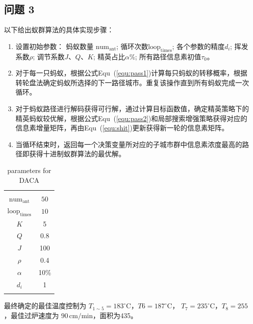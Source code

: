 \documentclass[../main.tex]{subfiles}
\begin{document}
\subsection{问题 3}
以下给出蚁群算法的具体实现步骤：
\begin{enumerate}
	\item 设置初始参数：
	蚂蚁数量 \(\mathrm{num}_{\mathrm{ant}}\); 循环次数\(\mathrm{loop}_{\mathrm{times}}\); 各个参数的精度\(d_i\); 挥发系数\(\rho\); 调节系数\(J\)、\(Q\)、\(K\); 精英占比\(\alpha  \%\); 所有路径信息素初值\(τ_0\)。
	\item 对于每一只蚂蚁，根据公式Equ~(\ref{equ:pass1})计算每只蚂蚁的转移概率，根据转轮盘法确定蚂蚁所选择的下一路径城市。重复该操作直到所有蚂蚁完成一次循环。
	\item 对于蚂蚁路径进行解码获得可行解，通过计算目标函数值，确定精英策略下的精英蚂蚁较优解，根据公式Equ~(\ref{equ:pass2})和局部搜索增强策略获得对应的信息素增量矩阵，再由Equ~(\ref{equ:shit})更新获得新一轮的信息素矩阵。
	\item 当循环结束时，返回每一个决策变量所对应的子城市群中信息素浓度最高的路径即获得十进制蚁群算法的最优解。
\end{enumerate}
\begin{table}[H]
	\centering
	\begin{tabular}{cc} 
	\makebox[5em][c]{参数名称} & \makebox[5em][c]{参数值} \\	\hline \hline
	\\[-1em]
	\(\mathrm{num}_{\mathrm{ant}}\) & \(50\) \\
	\(\mathrm{loop}_{\mathrm{times}}\) & \(10\)\\
	\(K\) & 5\\
	\(Q\) & 0.8\\
	\(J\) & 100\\
	\(\rho\) & 0.4 \\
	\(\alpha\) & 10\%\\
	\(d_{i}\) & 1 
	\\[-1em]
	\\ \hline
	\end{tabular}
	\caption{parameters for DACA}
\end{table}
最终确定的最佳温度控制为 \(T _{1 \sim 5}= 183 ^{\circ}\mathrm{C}\)，\(T6 = 187^{\circ}\mathrm{C}\)，
\(T_{7} = 235^{\circ}\mathrm{C}\)，\(T_8 = 255\)，最佳过炉速度为 \(90\,\mathrm{cm}/\mathrm{min}\)，面积为435。
\end{document}
